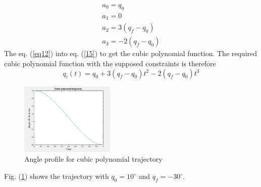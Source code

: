 \begin{equation} \label{15}
    \begin{split}
        a_0 = q_0 \\
        a_1 = 0 \\
        a_2 = 3(q_f - q_0 ) \\
        a_3 = -2(q_f - q_0)
    \end{split}
\end{equation}
The eq. (\ref{eq12}) into eq. (\ref{15}) to get the cubic polynomial function. The required cubic polynomial function with the supposed constraints is therefore
\begin{equation}
    q_i(t) = q_0 + 3(q_f - q_0)t^2 - 2(q_f - q_0)t^3
\end{equation}
\begin{figure}[H]
    \centering
    \includegraphics[width=0.4\textwidth]{sections/assets/cubic.png}
    \caption{Angle profile for cubic polynomial trajectory}
    \label{fig2}
\end{figure}
Fig. (\ref{fig2}) shows the trajectory with $q_0 = 10^\circ$ and $q_f = -30^\circ$.

